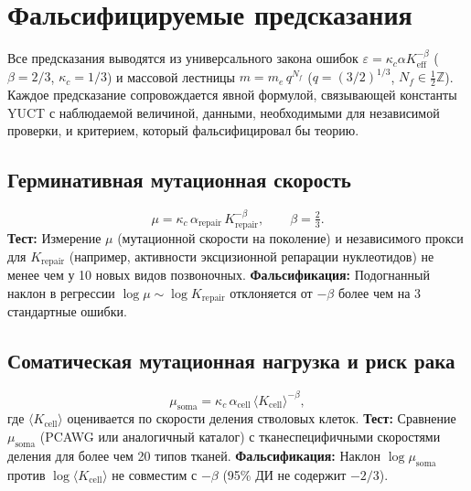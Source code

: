 \documentclass[11pt,a4paper]{article}
\begin{document}
	\section{Фальсифицируемые предсказания}
	
	Все предсказания выводятся из универсального закона ошибок
	\(\varepsilon = \kappa_c \alpha K_{\mathrm{eff}}^{-\beta}\)
	(\(\beta=2/3\), \(\kappa_c=1/3\)) и массовой лестницы
	\(m = m_e\,q^{N_f}\) (\(q=(3/2)^{1/3}\), \(N_f\in\tfrac12\mathbb{Z}\)).
	Каждое предсказание сопровождается явной формулой, связывающей константы YUCT с наблюдаемой величиной, данными, необходимыми для независимой проверки, и критерием, который фальсифицировал бы теорию.
	
	\subsection{Герминативная мутационная скорость}
	
	\begin{equation}\label{eq:pred-mutation}
		\mu = \kappa_c\,\alpha_{\mathrm{repair}}\,
		K_{\mathrm{repair}}^{-\beta}, \qquad \beta = \tfrac23 .
	\end{equation}
	\textbf{Тест:} Измерение \(\mu\) (мутационной скорости на поколение) и независимого прокси для \(K_{\mathrm{repair}}\) (например, активности эксцизионной репарации нуклеотидов) не менее чем у 10 новых видов позвоночных.
	\textbf{Фальсификация:} Подогнанный наклон в регрессии \(\log\mu \sim \log K_{\mathrm{repair}}\) отклоняется от \(-\beta\) более чем на 3 стандартные ошибки.
	
	\subsection{Соматическая мутационная нагрузка и риск рака}
	
	\begin{equation}\label{eq:pred-somatic}
		\mu_{\mathrm{soma}} = \kappa_c\,\alpha_{\mathrm{cell}}\,
		\langle K_{\mathrm{cell}}\rangle^{-\beta},
	\end{equation}
	где \(\langle K_{\mathrm{cell}}\rangle\) оценивается по скорости деления стволовых клеток.
	\textbf{Тест:} Сравнение \(\mu_{\mathrm{soma}}\) (PCAWG или аналогичный каталог) с тканеспецифичными скоростями деления для более чем 20 типов тканей.
	\textbf{Фальсификация:} Наклон \(\log\mu_{\mathrm{soma}}\) против \(\log\langle K_{\mathrm{cell}}\rangle\) не совместим с \(-\beta\) (95\% ДИ не содержит \(-2/3\)).
	
\end{document}
